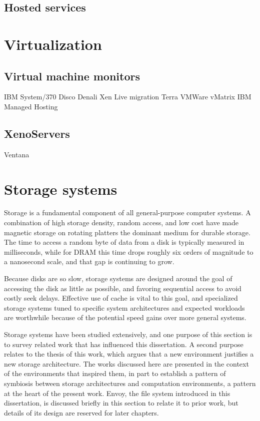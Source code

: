 \subsection{Hosted services}

\section{Virtualization}

\subsection{Virtual machine monitors}
IBM System/370 \cite{gum}
Disco
Denali
Xen \cite{barham}
Live migration \cite{clark} \cite{sapuntzakis02}
Terra \cite{garfinkel}
VMWare
vMatrix \cite{awadallah}
IBM Managed Hosting

\subsection{XenoServers}
\cite{kotsovinos}

Ventana \cite{pfaff}

\section{Storage systems}

Storage is a fundamental component of all general-purpose computer systems. A combination of high storage density, random access, and low cost have made magnetic storage on rotating platters the dominant medium for durable storage. The time to access a random byte of data from a disk is typically measured in milliseconds, while for DRAM this time drops roughly six orders of magnitude to a nanosecond scale, and that gap is continuing to grow.

Because disks are so slow, storage systems are designed around the goal of accessing the disk as little as possible, and favoring sequential access to avoid costly seek delays. Effective use of cache is vital to this goal, and specialized storage systems tuned to specific system architectures and expected workloads are worthwhile because of the potential speed gains over more general systems.

Storage systems have been studied extensively, and one purpose of this section is to survey related work that has influenced this dissertation. A second purpose relates to the thesis of this work, which argues that a new environment justifies a new storage architecture. The works discussed here are presented in the context of the environments that inspired them, in part to establish a pattern of symbiosis between storage architectures and computation environments, a pattern at the heart of the present work. Envoy, the file system introduced in this dissertation, is discussed briefly in this section to relate it to prior work, but details of its design are reserved for later chapters.


